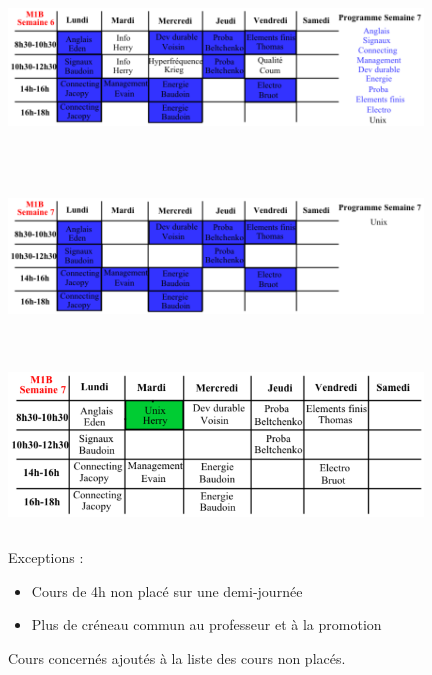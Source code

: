 \documentclass{beamer}
\begin{document}
\begin{frame}
\begin{center}
\includegraphics [width=110mm, height=45mm]{Dessin4.png}
\end{center}
\end{frame}

\begin{frame}
\begin{center}
\includegraphics [width=110mm, height=45mm]{Dessin5.png}
\end{center}
\end{frame}

\begin{frame}
\begin{center}
\includegraphics [width=110mm, height=45mm]{Dessin6.png}
\end{center}
\end{frame}

\begin{frame}
Exceptions :
\begin{itemize}
\item Cours de 4h non placé sur une demi-journée
\item Plus de créneau commun au professeur et à la promotion\\
\end{itemize}
Cours concernés ajoutés à la liste des cours non placés.
\end{frame}
\end{document}
